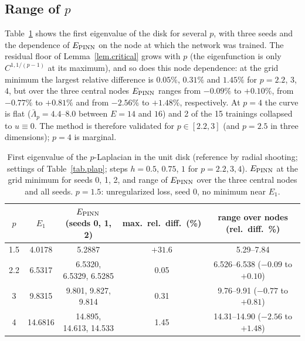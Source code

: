 \documentclass[10pt]{amsart}
\theoremstyle{definition}
\theoremstyle{remark}
\theoremstyle{plain}
\begin{document}
\subsection{Range of \texorpdfstring{$p$}{p}}
Table~\ref{tab.plap.p} shows the first eigenvalue of the disk for several $p$, with three seeds and
the dependence of $E_{\rm PINN}$ on the node at which the network was trained. The residual floor of
Lemma~\ref{lem.critical} grows with $p$ (the eigenfunction is only $C^{1,1/(p-1)}$ at its maximum),
and so does this node dependence: at the grid minimum the largest relative difference is $0.05\%$,
$0.31\%$ and $1.45\%$ for $p=2.2$, $3$, $4$, but over the three central nodes $E_{\rm PINN}$ ranges from
$-0.09\%$ to $+0.10\%$, from $-0.77\%$ to $+0.81\%$ and from $-2.56\%$ to $+1.48\%$, respectively. At
$p=4$ the curve is flat ($\bar\Lambda_p=4.4$--$8.0$ between $E=14$ and $16$) and 2 of the 15 trainings
collapsed to $u\equiv0$. The method is therefore validated for $p\in[2.2,3]$ (and $p=2.5$ in three
dimensions); $p=4$ is marginal.

\begin{table}[H]
\centering\small
\caption{First eigenvalue of the $p$-Laplacian in the unit disk (reference by radial shooting; settings of Table~\ref{tab.plap}; steps $h=0.5$, $0.75$, $1$ for $p=2.2,3,4$). $E_{\rm PINN}$ at the grid minimum for seeds 0, 1, 2, and range of $E_{\rm PINN}$ over the three central nodes and all seeds. $p=1.5$: unregularized loss, seed 0, no minimum near $E_1$.}
\label{tab.plap.p}
\begin{tabular}{ccccc}
\toprule
$p$ & $E_1$ & $E_{\rm PINN}$ (seeds 0, 1, 2) & max.\ rel.\ diff.\ (\%) & range over nodes (rel.\ diff.\ \%)\\
\midrule
1.5 & 4.0178 & 5.2887 & $+31.6$ & 5.29--7.84\\
2.2 & 6.5317 & 6.5320, 6.5329, 6.5285 & 0.05 & 6.526--6.538 ($-0.09$ to $+0.10$)\\
3 & 9.8315 & 9.801, 9.827, 9.814 & 0.31 & 9.76--9.91 ($-0.77$ to $+0.81$)\\
4 & 14.6816 & 14.895, 14.613, 14.533 & 1.45 & 14.31--14.90 ($-2.56$ to $+1.48$)\\
\bottomrule
\end{tabular}
\end{table}
\end{document}

